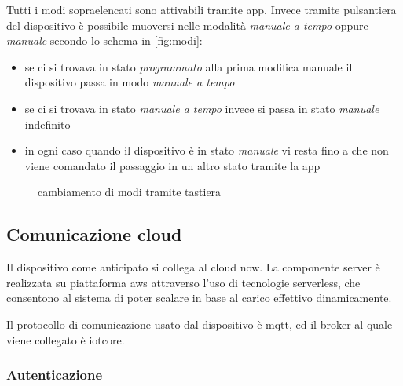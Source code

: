 \documentclass[12pt,a4paper,twoside,titlepage]{book}
\begin{document}
Tutti i modi sopraelencati sono attivabili tramite app. Invece tramite pulsantiera del dispositivo è possibile 
muoversi nelle modalità \textit{manuale a tempo} oppure \textit{manuale} secondo lo schema in \autoref{fig:modi}:
\begin{itemize}
    \item se ci si trovava in stato \textit{programmato} alla prima modifica manuale il dispositivo passa in 
        modo \textit{manuale a tempo}
    \item se ci si trovava in stato \textit{manuale a tempo} invece si passa in stato \textit{manuale} indefinito
    \item in ogni caso quando il dispositivo è in stato \textit{manuale} vi resta fino a che non viene comandato il 
        passaggio in un altro stato tramite la app
\end{itemize}

\begin{figure}[ht]
    \centering
    \caption{cambiamento di modi tramite tastiera}
    \label{fig:modi}
\end{figure}

\subsection{Comunicazione cloud}

Il dispositivo come anticipato si collega al \gls{cloud} \Gls{now}. La componente server è 
realizzata su piattaforma \Gls{aws} attraverso l'uso di tecnologie \gls{serverless}, che consentono 
al sistema di poter scalare in base al carico effettivo dinamicamente. 

Il protocollo di comunicazione usato dal dispositivo è \Gls{mqtt}, ed il \gls{broker} al quale 
viene collegato è \Gls{iotcore}. 

\subsubsection{Autenticazione}
\end{document}
